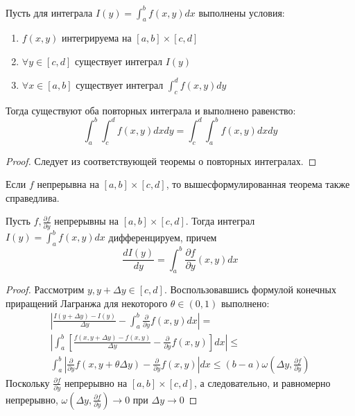 \documentclass[document.tex]{subfiles}
\begin{document}
\begin{theorem}
    Пусть для интеграла $I(y) = \int_{a}^{b}f(x, y)dx$ выполнены условия:
    \begin{enumerate}
        \item $f(x, y)$ интегрируема на $[a, b] \times [c, d]$
        \item $\forall y \in [c, d]$ существует интеграл $I(y)$
        \item $\forall x \in [a, b]$ существует интеграл $\int_{c}^{d}f(x, y) dy$
    \end{enumerate}
    Тогда существуют оба повторных интеграла и выполнено равенство:
    \[
        \int_{a}^{b} \int_{c}^{d} f(x, y) dxdy = \int_{c}^{d} \int_{a}^{b} f(x, y) dx dy
    \]
\end{theorem}

\begin{proof}
    Следует из соответствующей теоремы о повторных интегралах.
\end{proof}

\begin{corollary}
    Если $f$ непрерывна на $[a, b] \times [c, d]$, то вышесформулированная теорема также справедлива.
\end{corollary}

\begin{theorem}
    Пусть $f, \frac{\partial f}{\partial y}$ непрерывны на $[a, b] \times [c, d]$. Тогда интеграл
    $I(y) = \int_{a}^{b}f(x, y)dx$ дифференцируем, причем
    \[
        \frac{dI(y)}{dy} = \int_{a}^{b}\frac{\partial f}{\partial y}(x, y) dx
    \]
\end{theorem}

\begin{proof}
    Рассмотрим $y, y + \Delta y \in [c, d]$. Воспользовавшись формулой конечных приращений Лагранжа для некоторого
    $\theta \in (0, 1)$ выполнено:
    \begin{multline*}
        \left|\frac{I(y + \Delta y) - I(y)}{\Delta y} - \int_{a}^{b}\frac{\partial}{\partial y}f(x, y)dx \right| = \\
        \left| \int_{a}^{b} \left[ \frac{f(x, y + \Delta y) - f(x, y)}{\Delta y} - \frac{\partial}{\partial y}f(x, y)
        \right] dx\right| \leq \\
        \int_{a}^{b} \left|\frac{\partial}{\partial y}f(x, y + \theta \Delta y) - \frac{\partial}{\partial y}f(x, y)
        \right| dx \leq  (b - a) \omega(\Delta y, \frac{\partial f}{\partial y})
    \end{multline*}
    Поскольку $\frac{\partial f}{\partial y}$ непрерывно на $[a, b] \times [c, d]$, а следовательно, и равномерно
    непрерывно, $\omega(\Delta y, \frac{\partial f}{\partial y}) \rightarrow 0$ при $\Delta y \rightarrow 0$
\end{proof}
\end{document}
